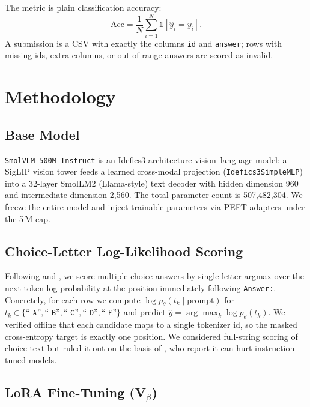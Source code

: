 \documentclass[11pt]{article}
\begin{document}
The metric is plain classification accuracy:
\begin{equation}
  \text{Acc} = \frac{1}{N} \sum_{i=1}^{N} \mathbb{1}\!\left[\hat{y}_i = y_i\right].
\end{equation}
\noindent A submission is a CSV with exactly the columns \texttt{id} and \texttt{answer}; rows with missing ids, extra columns, or out-of-range answers are scored as invalid.

\section{Methodology}

\subsection{Base Model}

\texttt{SmolVLM-500M-Instruct} \citep{laurencon2024smolvlm} is an Idefics3-architecture vision--language model: a SigLIP vision tower feeds a learned cross-modal projection (\texttt{Idefics3SimpleMLP}) into a 32-layer SmolLM2 (Llama-style) text decoder with hidden dimension 960 and intermediate dimension 2{,}560. The total parameter count is 507{,}482{,}304. We freeze the entire model and inject trainable parameters via PEFT adapters under the 5\,M cap.

\subsection{Choice-Letter Log-Likelihood Scoring}

\label{sec:scoring}
Following \citet{wiegreffe2023increasing} and \citet{tsvilodub2024predictions}, we score multiple-choice answers by single-letter argmax over the next-token log-probability at the position immediately following \texttt{Answer:}. Concretely, for each row we compute $\log p_\theta(t_k \mid \text{prompt})$ for $t_k \in \{\texttt{`` A''}, \texttt{`` B''}, \texttt{`` C''}, \texttt{`` D''}, \texttt{`` E''}\}$ and predict $\hat{y} = \arg\max_k \log p_\theta(t_k)$. We verified offline that each candidate maps to a single tokenizer id, so the masked cross-entropy target is exactly one position. We considered full-string scoring of choice text but ruled it out on the basis of \citet{wiegreffe2023increasing}, who report it can hurt instruction-tuned models.

\subsection{LoRA Fine-Tuning (V$_\beta$)}
\end{document}
